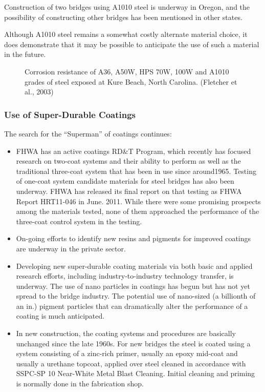 Construction of two bridges using A1010 steel is underway in Oregon, and the possibility of constructing other
bridges has been mentioned in other states.

Although A1010 steel remains a somewhat costly alternate material choice, it does demonstrate that it may be
possible to anticipate the use of such a material in the future.

\begin{figure}
  \caption{Corrosion resistance of A36, A50W, HPS 70W, 100W and A1010 grades of steel exposed at Kure Beach, North Carolina. (Fletcher et al., 2003)}
  \label{fig:corrosion-resistance-a36et}
\end{figure}

\subsubsection{Use of Super-Durable Coatings}
The search for the “Superman” of coatings continues:
\begin{itemize}
  \item FHWA has an active coatings RD\&T Program, which recently has focused research on two-coat systems and
  their ability to perform as well as the traditional three-coat system that has been in use since around1965.
  Testing of one-coat system candidate materials for steel bridges has also been underway. FHWA has released
  its final report on that testing as FHWA Report HRT11-046 in June. 2011. While there were some promising
  prospects among the materials tested, none of them approached the performance of the three-coat control
  system in the testing.
  \item On-going efforts to identify new resins and pigments for improved coatings are underway in the private
  sector.
  \item Developing new super-durable coating materials via both basic and applied research efforts, including
  industry-to-industry technology transfer, is underway. The use of nano particles in coatings has begun but has not yet spread to the bridge industry. The potential use of nano-sized (a billionth of an in.) pigment
  particles that can dramatically alter the performance of a coating is much anticipated.
  \item In new construction, the coating systems and procedures are basically unchanged since the late 1960s. For
  new bridges the steel is coated using a system consisting of a zinc-rich primer, usually an epoxy mid-coat
  and usually a urethane topcoat, applied over steel cleaned in accordance with SSPC-SP 10 Near-White Metal
  Blast Cleaning. Initial cleaning and priming is normally done in the fabrication shop.
\end{itemize}

